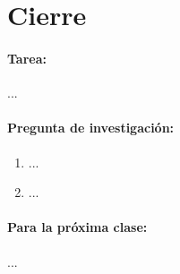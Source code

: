 \documentclass[a4,11pt]{aleph-notas}
\begin{document}
\section*{Cierre}

\paragraph{Tarea:}
...

\paragraph{Pregunta de investigación:}  
\begin{enumerate}[leftmargin=*]
    \item ...
    \item ...
\end{enumerate}
    
\paragraph{Para la próxima clase:}  
...
\end{document}
